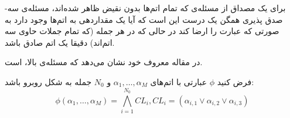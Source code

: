 \begin{definition}
    برای یک مصداق از مسئله‌ی
    که تمام اتم‌ها بدون نقیض ظاهر شده‌اند، مسئله‌ی سه-صدق پذیری همگن یک درست این است که آیا یک مقداردهی به اتم‌ها وجود دارد به صورتی که عبارت را ارضا کند در حالی که در هر جمله (که تمام جملات حاوی سه اتم‌اند) دقیقا یک اتم صادق باشد.
\end{definition}

در مقاله معروف خود
\cite{10.1145/800133.804350}
نشان می‌دهد که مسئله‌ی بالا،
\nphard
است.

فرض کنید
$\phi$
عبارتی با اتم‌های
$\alpha_1, \ldots, \alpha_M$
و
$N_0$
جمله به شکل روبرو باشد:
$$\phi(\alpha_1, \ldots, \alpha_M) = \bigwedge\limits_{i = 1}^{N_0} CL_i, CL_i = (\alpha_{i, 1} \vee \alpha_{i, 2} \vee \alpha_{i, 3})$$

